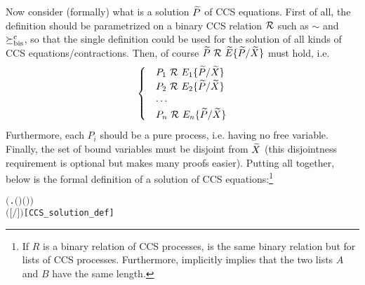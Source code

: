 Now consider (formally) what is a solution $\widetilde P$ of CCS equations. First of
all, the definition should be parametrized on a binary CCS
relation ${\cal R}$ such as $\sim$ and $\mathrel{\succeq^{\rm{c}}_{\rm{bis}}}$, so that the single definition
could be used for the solution of all kinds of CCS
equations/contractions. Then, of course ${\widetilde P} \ {\cal R}\  {\widetilde E}\{\widetilde
P/\widetilde X\}$ must hold, i.e.
\begin{equation*}
  \begin{cases}
    &P_1 \ {\cal R}\ E_1\{\widetilde P/\widetilde X\} \\
    &P_2 \ {\cal R}\ E_2\{\widetilde P/\widetilde X\} \\
    & \cdots \\
    &P_n \ {\cal R}\ E_n\{\widetilde P/\widetilde X\}
  \end{cases}
\end{equation*}
Furthermore, each $P_i$ should be a pure process, i.e. having no free
variable.
Finally, 
the set of bound variables %
must be disjoint from
$\widetilde X$ (this disjointness requirement is optional but makes many proofs
easier). Putting all together,
below is the formal definition of a solution of \multivariate CCS
equations:\footnote{If $R$ is a binary relation of CCS processes,
   is the same binary relation but for lists of
  CCS processes. Furthermore,  implicitly
  implies that the two lists $A$ and $B$ have the same length.}
\begin{alltt}
   \HOLTokenTurnstile{}      \HOLSymConst{\HOLTokenEquiv{}}
        \HOLSymConst{\HOLTokenConj{}}  \ensuremath{(}\HOLTokenLambda{}.  \ensuremath{(} \ensuremath{)} \ensuremath{(} \ensuremath{)}\ensuremath{)}  \HOLSymConst{\HOLTokenConj{}}
         \ensuremath{(} \ensuremath{[}\ensuremath{/}\ensuremath{]} \ensuremath{)}\hfill{[CCS_solution_def]}
\end{alltt}
